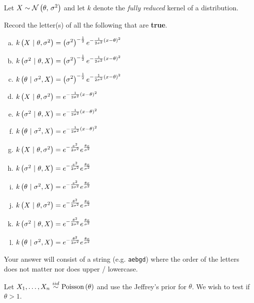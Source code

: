 \documentclass[12pt]{article}
\newcommand{\instr}{Your answer will consist of a string (e.g. \texttt{aebgd}) where the order of the letters does not matter nor does upper / lowercase.}
\begin{document}

\problem [8min] Let $X \sim \mathcal{N}\left(\theta,\,\sigma^2\right)$ and let $k$ denote the \emph{fully reduced} kernel of a distribution.

\benum

 Record the letter(s) of all the following that are \textbf{true}.


\begin{enumerate}[(a)]

\item $k\left(X~|~\theta,\sigma^2\right) = \displaystyle\left(\sigma^2\right)^{-\frac{1}{2}}e^{-\frac{1}{2\sigma^2}(x - \theta)^2}$
\item $k\left(\sigma^2~|~\theta,X\right) = \displaystyle\left(\sigma^2\right)^{-\frac{1}{2}}e^{-\frac{1}{2\sigma^2}(x - \theta)^2}$
\item $k\left(\theta~|~\sigma^2,X\right) = \displaystyle\left(\sigma^2\right)^{-\frac{1}{2}}e^{-\frac{1}{2\sigma^2}(x - \theta)^2}$

\item $k\left(X~|~\theta,\sigma^2\right) = e^{-\frac{1}{2\sigma^2}(x - \theta)^2}$
\item $k\left(\sigma^2~|~\theta,X\right) = e^{-\frac{1}{2\sigma^2}(x - \theta)^2}$
\item $k\left(\theta~|~\sigma^2,X\right) = e^{-\frac{1}{2\sigma^2}(x - \theta)^2}$

\item $k\left(X~|~\theta,\sigma^2\right) = e^{-\frac{x^2}{2\sigma^2}}e^{\frac{\theta x}{\sigma^2}}$
\item $k\left(\sigma^2~|~\theta,X\right) = e^{-\frac{x^2}{2\sigma^2}}e^{\frac{\theta x}{\sigma^2}}$
\item $k\left(\theta~|~\sigma^2,X\right) = e^{-\frac{x^2}{2\sigma^2}}e^{\frac{\theta x}{\sigma^2}}$

\item $k\left(X~|~\theta,\sigma^2\right) = e^{-\frac{\theta^2}{2\sigma^2}}e^{\frac{\theta x}{\sigma^2}}$
\item $k\left(\sigma^2~|~\theta,X\right) = e^{-\frac{\theta^2}{2\sigma^2}}e^{\frac{\theta x}{\sigma^2}}$
\item $k\left(\theta~|~\sigma^2,X\right) = e^{-\frac{\theta^2}{2\sigma^2}}e^{\frac{\theta x}{\sigma^2}}$
\end{enumerate}
\eenum\instr\pagebreak



\problem [8min] Let $\Xoneton \iid \poisson{\theta}$ and use the Jeffrey's prior for $\theta$. We wish to test if $\theta > 1$.
\end{document}
